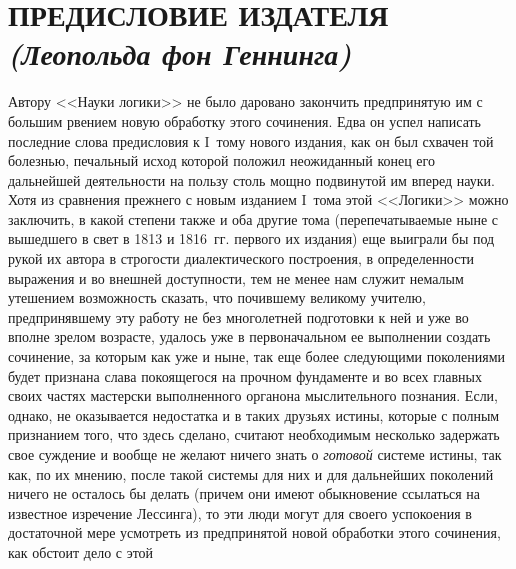 \hrulefill

\chapter[Предисловие издателя (Леопольда фон Геннинга)]{ПРЕДИСЛОВИЕ ИЗДАТЕЛЯ\\{\em (Леопольда фон Геннинга)}}

Автору <<Науки логики>> не было даровано закончить предпринятую им с большим
рвением новую обработку этого сочинения. Едва он успел написать последние
слова предисловия к I~тому нового издания, как он был схвачен той болезнью,
печальный исход которой положил неожиданный конец его дальнейшей
деятельности на пользу столь мощно подвинутой им вперед науки. Хотя из
сравнения прежнего с новым изданием I~тома этой <<Логики>> можно заключить, в
какой степени также и оба другие тома (перепечатываемые ныне с вышедшего в
свет в 1813 и 1816~гг. первого их издания) еще выиграли бы под рукой их
автора в строгости диалектического построения, в определенности выражения и
во внешней доступности, тем не менее нам служит немалым утешением
возможность сказать, что почившему великому учителю, предпринявшему эту
работу не без многолетней подготовки к ней и уже во вполне зрелом возрасте,
удалось уже в первоначальном ее выполнении создать сочинение, за которым
как уже и ныне, так еще более следующими поколениями будет признана слава
покоящегося на прочном фундаменте и во всех главных своих частях мастерски
выполненного органона мыслительного познания. Если, однако, не оказывается
недостатка и в таких друзьях истины, которые с полным признанием того, что
здесь сделано, считают необходимым несколько задержать свое суждение и
вообще не желают ничего знать о {\em готовой} системе
истины, так как, по их мнению, после такой системы для них и для дальнейших
поколений ничего не осталось бы делать (причем они имеют обыкновение
ссылаться на известное изречение Лессинга),
то эти люди могут для своего успокоения в достаточной мере усмотреть из
предпринятой новой обработки этого сочинения, как обстоит дело с этой
